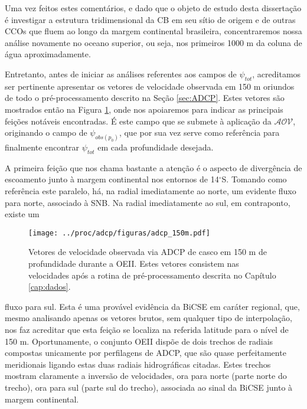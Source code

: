 Uma vez feitos estes comentários, e dado que o objeto de estudo desta dissertação é investigar a estrutura tridimensional
da CB em seu sítio de origem e de outras CCOs que fluem ao longo da margem continental brasileira, concentraremos nossa 
análise novamente no oceano superior, ou seja, nos primeiros 1000 m da coluna de água aproximadamente. 

Entretanto, antes de iniciar as análises referentes aos campos de $\psi_{tot}$, acreditamos ser pertinente apresentar
os vetores de velocidade observada em 150 m oriundos de todo o pré-processamento descrito na Seção \ref{sec:ADCP}. Estes
vetores são mostrados então na Figura \ref{fig:adcpvet}, onde nos apoiaremos para indicar as principais feições
notáveis encontradas. É este campo que se submete à aplicação da $\mathcal{AOV}$, originando o campo de 
$\psi_{obs(p_0)}$, que por sua vez serve como referência para finalmente encontrar $\psi_{tot}$ em cada profundidade
desejada.

A primeira feição que nos chama bastante a atenção é o aspecto de divergência de escoamento junto à margem 
continental nos entornos de 14$^\circ$S.
 Tomando como referência este paralelo, 
há, na radial imediatamente ao norte, um evidente fluxo para norte, associado à SNB. Na radial imediatamente ao sul, 
em contraponto, existe um 

\begin{figure}%
 \begin{center}
  \texttt{[image: ../proc/adcp/figuras/adcp\_150m.pdf]}
 \end{center}
 \vspace{-.25cm}
 \renewcommand{\baselinestretch}{1}
 \caption{\label{fig:adcpvet} \small Vetores de velocidade observada via ADCP de casco em 150 m de profundidade durante a OEII. 
Estes vetores consistem nas velocidades após a rotina de pré-processamento descrita no Capítulo \ref{cap:dados}.}
\end{figure} 

fluxo para sul. Esta é uma provável evidência da BiCSE em caráter regional,
 que, mesmo analisando apenas os vetores
brutos, sem qualquer tipo de interpolação, nos faz acreditar que esta feição se localiza na referida latitude para o nível de 150 m. 
Oportunamente, o conjunto OEII dispõe de dois trechos de radiais compostas unicamente por perfilagens de ADCP, 
que são quase perfeitamente meridionais ligando estas duas radiais hidrográficas citadas. Estes
trechos mostram claramente a inversão de velocidades, ora para norte (parte norte do trecho), 
ora para sul (parte sul do trecho), 
associada ao sinal da BiCSE junto à margem continental.

